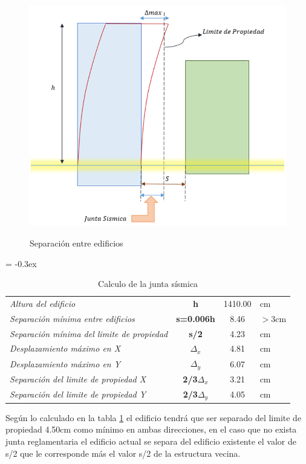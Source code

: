 \begin{figure}[h!]
    \centering
    \caption{Separación entre edificios}
    \includegraphics[scale=0.67]{IMAGENES/23.PNG}
    \label{ver}
\end{figure}
\newpage
\begin{table}[h!]
  \centering
  \caption{Calculo de la junta sísmica}
  \vspace{0.5cm}
      {
\extrarowheight = -0.3ex
\renewcommand{\arraystretch}{1.35}
    \begin{tabular}{l|c|c|l}
\cline{2-3}    \textit{Altura del edificio } & \textbf{h} & 1410.00 & cm \\
\cline{2-3}    \textit{Separación mínima entre edificios } & \textbf{s=0.006h} & 8.46  & $>$3cm \\
\cline{2-3}    \textit{Separación mínima del limite de propiedad} & \textbf{s/2} & 4.23  & cm \\
\cline{2-3}    \textit{Desplazamiento máximo en X } & \textbf{$\Delta _{x}$} & 4.81  & cm \\
\cline{2-3}    \textit{Desplazamiento máximo en Y } & \textbf{$\Delta _{y}$} & 6.07  & cm \\
\cline{2-3}    \textit{Separación del limite de propiedad X} & \textbf{2/3$\Delta _{x}$} & 3.21  & cm \\
\cline{2-3}    \textit{Separación del limite de propiedad Y} & \textbf{2/3$\Delta _{y}$} & 4.05  & cm \\
\cline{2-3}    \end{tabular}%
}
  \label{jun}%
\end{table}%

\noindent Según lo calculado en la tabla \ref{jun}  el edificio tendrá que ser separado del limite de propiedad 4.50cm como mínimo en ambas direcciones, en el caso que no exista junta reglamentaria el edificio actual se separa del edificio existente el valor de s/2 que le corresponde más el valor s/2 de la estructura vecina.